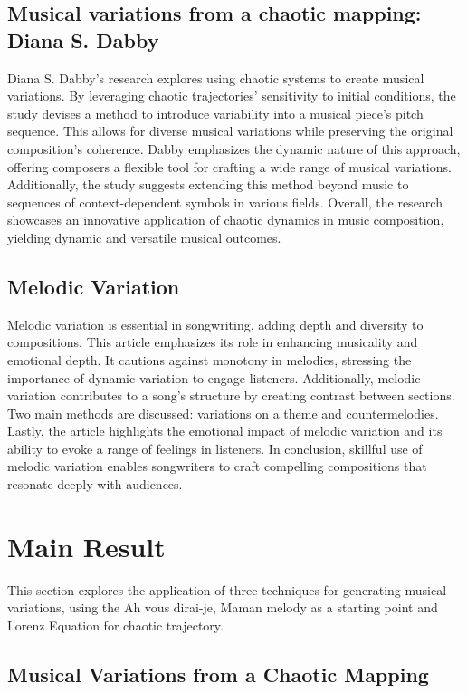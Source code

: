 \documentclass[11pt]{article}
\begin{document}
\subsection{Musical variations from a chaotic mapping: Diana S. Dabby}
Diana S. Dabby's research \cite{dabby_musical_1996} explores using chaotic systems to create musical variations. By leveraging chaotic trajectories' sensitivity to initial conditions, the study devises a method to introduce variability into a musical piece's pitch sequence. This allows for diverse musical variations while preserving the original composition's coherence. Dabby emphasizes the dynamic nature of this approach, offering composers a flexible tool for crafting a wide range of musical variations. Additionally, the study suggests extending this method beyond music to sequences of context-dependent symbols in various fields. Overall, the research showcases an innovative application of chaotic dynamics in music composition, yielding dynamic and versatile musical outcomes.

\subsection{Melodic Variation}
Melodic variation is essential in songwriting, adding depth and diversity to compositions. This article emphasizes its role in enhancing musicality and emotional depth. It cautions against monotony in melodies, stressing the importance of dynamic variation to engage listeners. Additionally, melodic variation contributes to a song's structure by creating contrast between sections. Two main methods are discussed: variations on a theme and countermelodies. Lastly, the article highlights the emotional impact of melodic variation and its ability to evoke a range of feelings in listeners. In conclusion, skillful use of melodic variation enables songwriters to craft compelling compositions that resonate deeply with audiences.

\section{Main Result}

This section explores the application of three techniques for generating musical variations, using the Ah vous dirai-je, Maman melody as a starting point and Lorenz Equation for chaotic
trajectory.

\subsection{Musical Variations from a Chaotic Mapping}
\end{document}
